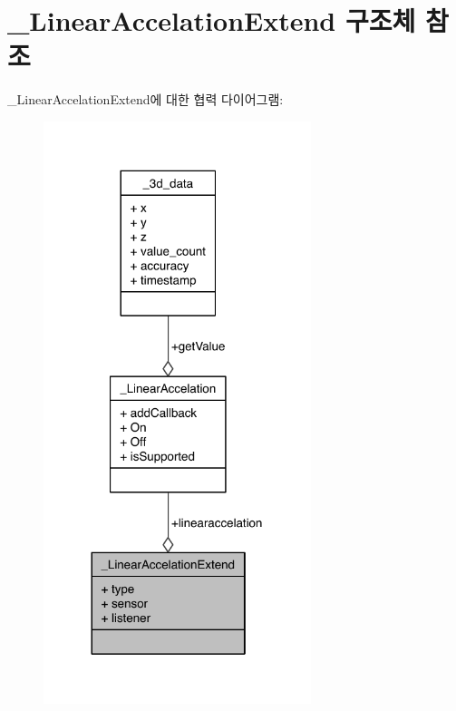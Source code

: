 \hypertarget{struct___linear_accelation_extend}{\section{\-\_\-\-Linear\-Accelation\-Extend 구조체 참조}
\label{struct___linear_accelation_extend}
}


\-\_\-\-Linear\-Accelation\-Extend에 대한 협력 다이어그램\-:\nopagebreak
\begin{figure}[H]
\begin{center}
\leavevmode
\includegraphics[width=221pt]{d4/dbb/struct___linear_accelation_extend__coll__graph}
\end{center}
\end{figure}
